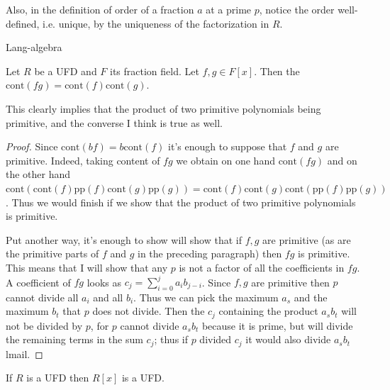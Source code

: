 Also, in the definition of order of a
fraction $a$ at a prime $p$, notice
 the order well-defined, i.e. unique, by the
 uniqueness of the factorization
in $R$.

\begin{lemma}
\label{lemma-true-Gauss}
\begin{reference}
\cite{Chapter 4, Theorem 2.1}{Lang-algebra}
\end{reference}
Let $R$ be a UFD and $F$ its fraction field.
Let $f,g\in F[x]$. Then the
$\text{cont}(fg)=\text{cont}(f)\text{cont}(g)
$.
\end{lemma}

This clearly implies that the product of two
primitive polynomials being
primitive, and the converse I think is true
as well.

\begin{proof}
Since $\text{cont}(bf)=b\text{cont}(f)$ it's
enough to suppose that  $f$ and $g$
are primitive. Indeed, taking content of $fg$
we obtain on one hand
$\text{cont}(fg)$ and on the other hand
$\text{cont}(\text{cont}(f)\text{pp}(f)
\text{cont}(g)\text{pp}(g))
=\text{cont}(f)\text{cont}(g)\text{cont}
(\text{pp}(f)\text{pp}(g))$.
Thus we would finish if we show that the
product of two primitive polynomials is
primitive.

Put another way, it's enough to show will
show that if $f,g$ are primitive (as
are the primitive parts of $f$ and $g$ in the
preceding paragraph) then $fg$ is
primitive. This means that I will show that
any $p$ is not a factor of all the
coefficients in $fg$. A coefficient of $fg$
looks as
$c_j=\sum_{i=0}^ja_ib_{j-i}$.  Since $f,g$
are primitive then $p$ cannot divide
all $a_i$ and all $b_i$.  Thus we can pick
the maximum $a_s$ and the maximum
$b_t$ that $p$ does not divide. Then the
$c_j$ containing the product $a_sb_t$
will not be divided by $p$, for $p$ cannot
divide $a_sb_t$ because it is prime,
but will divide the remaining terms in the
sum $c_j$; thus if $p$ divided $c_j$
it would also divide $a_sb_t$lmail.
\end{proof}

\begin{lemma}[Gauss]
\label{lemma-R-UFD-implies-%
R[x]-UFD}
\begin{reference}
\cite[Chapter 4, Theorem 2.3]{Lang-algebra}
\end{reference}
If $R$ is a UFD then $R[x]$ is a UFD.
\end{lemma}

